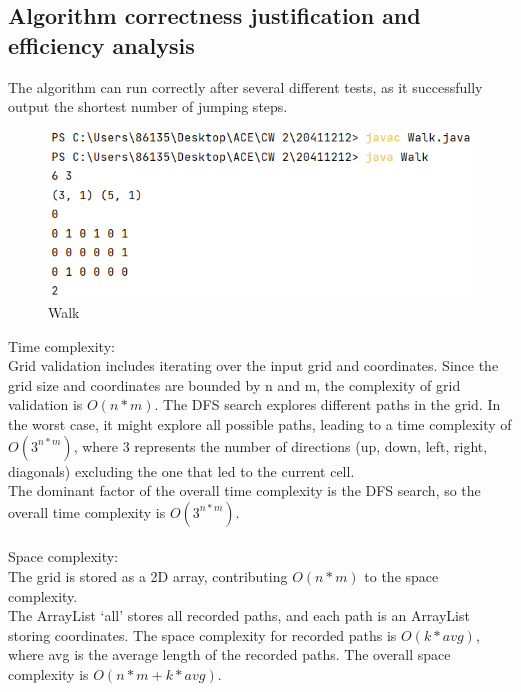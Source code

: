 \documentclass{article}
\begin{document}
\subsection{Algorithm correctness justification and efficiency analysis}
The algorithm can run correctly after several different tests, as it successfully output the shortest number of jumping steps.
\begin{figure}[H]
\centering
\includegraphics[scale=0.6]{Walk.png}
\caption{Walk}
\end{figure}
Time complexity:\\
Grid validation includes iterating over the input grid and coordinates. Since the grid size and coordinates are bounded by n and m, the complexity of grid validation is $O(n * m)$. The DFS search explores different paths in the grid. In the worst case, it might explore all possible paths, leading to a time complexity of$O(3^{n*m})$, where $3$ represents the number of directions (up, down, left, right, diagonals) excluding the one that led to the current cell.\\
The dominant factor of the overall time complexity is the DFS search, so the overall time complexity is $O(3^{n*m})$.\\~\\
Space complexity:\\
The grid is stored as a 2D array, contributing $O(n * m)$ to the space complexity.\\
The ArrayList `all' stores all recorded paths, and each path is an ArrayList storing coordinates. The space complexity for recorded paths is $O(k * avg)$, where avg is the average length of the recorded paths.
The overall space complexity is $O(n * m + k * avg).$
\end{document}
